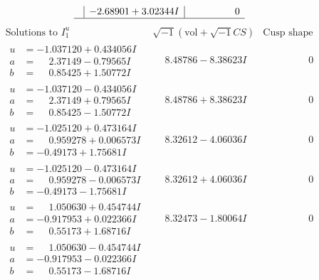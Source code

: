 \documentclass[1p]{elsarticle_modified}
\theoremstyle{definition}
\newcommand{\I}{\sqrt{-1}}
\begin{document}
$$\begin{array}{c|c|c}
 & -2.68901 + 3.02344 I & \phantom{-0.000000 } 0\\
 \hline 
 \end{array}$$\newpage$$\begin{array}{c|c|c}  
\text{Solutions to }I^u_{1}& \I (\text{vol} + \sqrt{-1}CS) & \text{Cusp shape}\\
 \hline 
\begin{aligned}
u &= -1.037120 + 0.434056 I \\
a &= \phantom{-}2.37149 - 0.79565 I \\
b &= \phantom{-}0.85425 + 1.50772 I\end{aligned}
 & \phantom{-}8.48786 - 8.38623 I & \phantom{-0.000000 } 0 \\ \hline\begin{aligned}
u &= -1.037120 - 0.434056 I \\
a &= \phantom{-}2.37149 + 0.79565 I \\
b &= \phantom{-}0.85425 - 1.50772 I\end{aligned}
 & \phantom{-}8.48786 + 8.38623 I & \phantom{-0.000000 } 0 \\ \hline\begin{aligned}
u &= -1.025120 + 0.473164 I \\
a &= \phantom{-}0.959278 + 0.006573 I \\
b &= -0.49173 + 1.75681 I\end{aligned}
 & \phantom{-}8.32612 - 4.06036 I & \phantom{-0.000000 } 0 \\ \hline\begin{aligned}
u &= -1.025120 - 0.473164 I \\
a &= \phantom{-}0.959278 - 0.006573 I \\
b &= -0.49173 - 1.75681 I\end{aligned}
 & \phantom{-}8.32612 + 4.06036 I & \phantom{-0.000000 } 0 \\ \hline\begin{aligned}
u &= \phantom{-}1.050630 + 0.454744 I \\
a &= -0.917953 + 0.022366 I \\
b &= \phantom{-}0.55173 + 1.68716 I\end{aligned}
 & \phantom{-}8.32473 - 1.80064 I & \phantom{-0.000000 } 0 \\ \hline\begin{aligned}
u &= \phantom{-}1.050630 - 0.454744 I \\
a &= -0.917953 - 0.022366 I \\
b &= \phantom{-}0.55173 - 1.68716 I\end{aligned}

\end{array}$$
\end{document}
